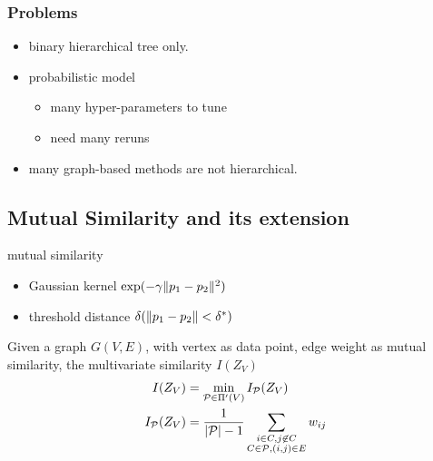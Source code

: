 \documentclass{beamer}
\begin{document}
\begin{frame}
\frametitle{Problems}
\begin{itemize}
\item binary hierarchical tree only.
\item probabilistic model
\begin{itemize}
\item many hyper-parameters to tune 
\item need many reruns
\end{itemize}
\item many graph-based methods are not hierarchical.
\end{itemize}
\end{frame}

\subsection{Mutual Similarity and its extension}
\begin{frame}
\begin{block}{mutual similarity}
\begin{itemize}
\item Gaussian kernel $ \exp({-\gamma \lVert p_1 - p_2\rVert^2})$
\item threshold distance $\delta(\lVert p_1-p_2\rVert < \delta^*)$
\end{itemize}
\end{block}

\begin{definition}
Given a graph $G(V, E)$, with vertex as data point, edge weight as mutual similarity, the multivariate similarity $I(Z_V)$
\begin{align}
I(Z_V) & = \min_{\mathcal{P} \in \Pi'(V)} I_{\mathcal{P}}(Z_V) \\
\label{eq:newDef}  I_{\mathcal{P}}(Z_V) & = \frac{1}{ \lvert\mathcal{P}\rvert - 1} \sum_{\substack{i\in C, j \not\in C\\ C\in \mathcal{P}, (i,j) \in E}} w_{ij}
\end{align}
\end{definition}
\end{frame}
\end{document}

